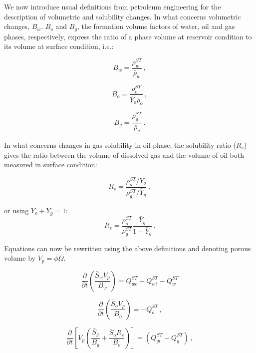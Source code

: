 \documentclass[authoryear,preprint,review,11pt]{elsarticle}
\begin{document}
We now introduce usual definitions from petroleum engineering for the description of volumetric and solubility changes. In what concerns volumetric changes, $B_w$, $B_o$ and $B_g$, the formation volume factors of water, oil and gas phases, respectively, express the ratio of a phase volume at reservoir condition to its volume at surface condition, i.e.:

\begin{equation}\label{eq: Bw}
B_w = \frac{\rho_w^{ST}}{\bar{\rho}_w} \, ,
\end{equation}

\begin{equation}\label{eq: Bo}
B_o = \frac{\rho_o^{ST}}{\bar{Y}_o \bar{\rho}_o} \, ,
\end{equation}

\begin{equation}\label{eq: Bg}
B_g = \frac{\rho_g^{ST}}{\bar{\rho}_g} \, .
\end{equation}

In what concerns changes in gas solubility in oil phase, the solubility ratio ($R_s$) gives the ratio between the volume of dissolved gas and the volume of oil both measured in surface condition:

\begin{equation}
R_s = \frac{\rho_o^{ST} / \bar{Y}_o}{\rho_g^{ST} / \bar{Y}_g} \, ,
\end{equation}

or using $\bar{Y}_o + \bar{Y}_g = 1$:
\begin{equation}
R_s = \frac{\rho_o^{ST}}{\rho_g^{ST}}\frac{\bar{Y}_g}{1-\bar{Y}_g} \, .
\end{equation}

Equations can now be rewritten using the above definitions and denoting porous volume by $V_p = \bar{\phi}\Omega$.

\begin{equation}\label{eq: Sw4}
\frac{\partial}{\partial t} \left(\frac{\bar{S}_w V_p}{B_w} \right) = Q_{we}^{ST} + Q_{wi}^{ST}-Q_w^{ST}
\end{equation}

\begin{equation}\label{eq: So4}
\frac{\partial}{\partial t} \left(\frac{\bar{S}_o V_p}{B_o} \right) = - Q_o^{ST} \, ,
\end{equation}

\begin{equation}\label{eq: Sg4}
\frac{\partial}{\partial t} \left[ V_p \left(\frac{\bar{S}_g}{B_g} + \frac{\bar{S}_o R_s}{B_o} \right) \right] = \left( Q_{gi}^{ST}-Q_g^{ST} \right) \, ,
\end{equation}
\end{document}
